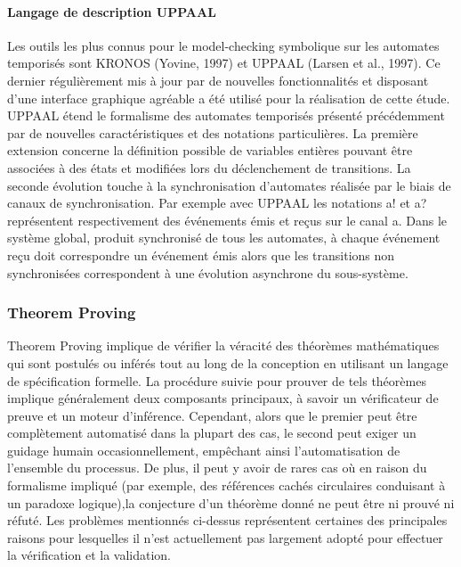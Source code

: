 \documentclass[french]{spimufcphdthesis}
\begin{document}
\paragraph{Langage de description UPPAAL}

 Les outils les plus connus pour le model-checking symbolique sur les automates temporisés sont KRONOS (Yovine, 1997) et UPPAAL (Larsen et al., 1997). Ce dernier régulièrement mis à jour par de nouvelles fonctionnalités et disposant d’une interface graphique agréable a été utilisé pour la réalisation de cette étude. UPPAAL étend le formalisme des automates temporisés présenté précédemment par de nouvelles caractéristiques et des notations particulières. La première extension concerne la définition possible de variables entières pouvant être associées à des états et modifiées lors du déclenchement de transitions. La seconde évolution touche à la synchronisation d’automates réalisée par le biais de canaux de synchronisation. Par exemple avec UPPAAL les notations a! et a? représentent respectivement des événements émis et reçus sur le canal a. Dans le système global, produit synchronisé de tous les automates, à chaque événement reçu doit correspondre un événement émis alors que les transitions
non synchronisées correspondent à une évolution asynchrone du sous-système.

\subsubsection{Theorem Proving}

 Theorem Proving implique de vérifier la véracité des théorèmes mathématiques qui sont postulés ou inférés tout au long de la conception en utilisant un langage de spécification formelle. La procédure suivie pour prouver de tels théorèmes implique généralement deux composants principaux, à savoir un vérificateur de preuve et un moteur d'inférence. Cependant, alors que le premier peut être complètement automatisé dans la plupart des cas, le second peut exiger un guidage humain occasionnellement, empêchant ainsi l'automatisation de l'ensemble du processus.
 De plus, il peut y avoir de rares cas où en raison du formalisme impliqué (par exemple, des références cachés circulaires conduisant à un paradoxe logique),la conjecture d'un théorème donné ne peut être ni prouvé ni réfuté. Les problèmes mentionnés ci-dessus représentent certaines des principales raisons pour lesquelles il n'est actuellement pas largement adopté pour effectuer la vérification et la validation.
\end{document}
